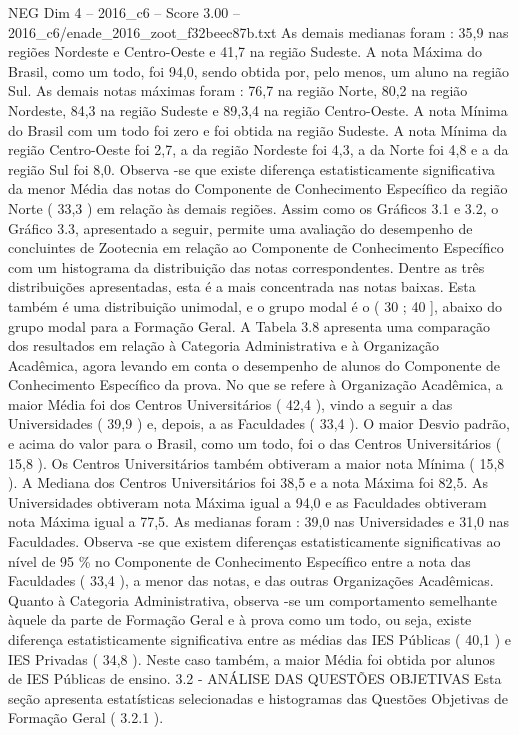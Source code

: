 \begin{textsample}{NEG Dim 4 – 2016\_c6 – Score 3.00 – 2016\_c6/enade\_2016\_zoot\_f32beec87b.txt}
As demais medianas foram : 35,9 nas regiões Nordeste e Centro-Oeste e 41,7 na região Sudeste.
A nota Máxima do Brasil, como um todo, foi 94,0, sendo obtida por, pelo menos, um aluno na região Sul.
As demais notas máximas foram : 76,7 na região Norte, 80,2 na região Nordeste, 84,3 na região Sudeste e 89,3,4 na região Centro-Oeste.
A nota Mínima do Brasil com um todo foi zero e foi obtida na região Sudeste.
A nota Mínima da região Centro-Oeste foi 2,7, a da região Nordeste foi 4,3, a da Norte foi 4,8 e a da região Sul foi 8,0.
Observa -se que existe diferença estatisticamente significativa da menor Média das notas do Componente de Conhecimento Específico da região Norte ( 33,3 ) em relação às demais regiões.
Assim como os Gráficos 3.1 e 3.2, o Gráfico 3.3, apresentado a seguir, permite uma avaliação do desempenho de concluintes de Zootecnia em relação ao Componente de Conhecimento Específico com um histograma da distribuição das notas correspondentes.
Dentre as três distribuições apresentadas, esta é a mais concentrada nas notas baixas.
Esta também é uma distribuição unimodal, e o grupo modal é o ( 30 ; 40 ], abaixo do grupo modal para a Formação Geral.
A Tabela 3.8 apresenta uma comparação dos resultados em relação à Categoria Administrativa e à Organização Acadêmica, agora levando em conta o desempenho de alunos do Componente de Conhecimento Específico da prova.
No que se refere à Organização Acadêmica, a maior Média foi dos Centros Universitários ( 42,4 ), vindo a seguir a das Universidades ( 39,9 ) e, depois, a as Faculdades ( 33,4 ).
O maior Desvio padrão, e acima do valor para o Brasil, como um todo, foi o das Centros Universitários ( 15,8 ).
Os Centros Universitários também obtiveram a maior nota Mínima ( 15,8 ).
A Mediana dos Centros Universitários foi 38,5 e a nota Máxima foi 82,5.
As Universidades obtiveram nota Máxima igual a 94,0 e as Faculdades obtiveram nota Máxima igual a 77,5.
As medianas foram : 39,0 nas Universidades e 31,0 nas Faculdades.
Observa -se que existem diferenças estatisticamente significativas ao nível de 95 \% no Componente de Conhecimento Específico entre a nota das Faculdades ( 33,4 ), a menor das notas, e das outras Organizações Acadêmicas.
Quanto à Categoria Administrativa, observa -se um comportamento semelhante àquele da parte de Formação Geral e à prova como um todo, ou seja, existe diferença estatisticamente significativa entre as médias das IES Públicas ( 40,1 ) e IES Privadas ( 34,8 ).
Neste caso também, a maior Média foi obtida por alunos de IES Públicas de ensino. 3.2 - ANÁLISE DAS QUESTÕES OBJETIVAS Esta seção apresenta estatísticas selecionadas e histogramas das Questões Objetivas de Formação Geral ( 3.2.1 ).

\end{textsample}
